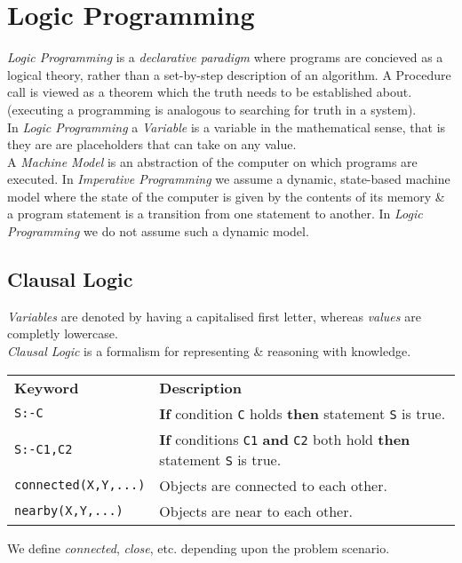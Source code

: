 \documentclass[11pt,a4paper]{article}
\begin{document}
\section{Logic Programming}

\textit{Logic Programming} is a \textit{declarative paradigm} where programs are concieved as a logical theory, rather than a set-by-step description of an algorithm. A Procedure call is viewed as a theorem which the truth needs to be established about. (\ie executing a programming is analogous to searching for truth in a system).\\

In \textit{Logic Programming} a \textit{Variable} is a variable in the mathematical sense, that is they are are placeholders that can take on any value.\\

A \textit{Machine Model} is an abstraction of the computer on which programs are executed. In \textit{Imperative Programming} we assume a dynamic, state-based machine model where the state of the computer is given by the contents of its memory \& a program statement is a transition from one statement to another. In \textit{Logic Programming} we do not assume such a dynamic model.

\subsection{Clausal Logic}

\textit{Variables} are denoted by having a capitalised first letter, whereas \textit{values} are completly lowercase.\\

\textit{Clausal Logic} is a formalism for representing \& reasoning with knowledge.\\
\begin{center}
\begin{tabular}{|l|l|}
\textbf{Keyword}&\textbf{Description}\\
{\lstinline!S:-C!}&\textbf{If} condition {\lstinline!C!} holds \textbf{then} statement {\lstinline!S!} is true.\\
{\lstinline!S:-C1,C2!}&\textbf{If} conditions {\lstinline!C1!} \textbf{and} {\lstinline!C2!} both hold \textbf{then} statement {\lstinline!S!} is true.\\
{\lstinline!connected(X,Y,...)!}&Objects are connected to each other.\\
{\lstinline!nearby(X,Y,...)!}&Objects are near to each other.\\
\end{tabular}
\end{center}
\nb We define \textit{connected}, \textit{close}, etc. depending upon the problem scenario.\\
\end{document}
